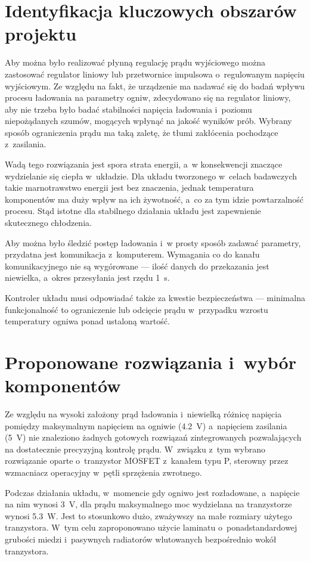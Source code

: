 \documentclass[polish,engineer]{polsl-msth}
\begin{document}
\section{Identyfikacja kluczowych obszarów projektu}
Aby można było realizować płynną regulację prądu wyjściowego można zastosować regulator liniowy lub przetwornice impulsowa o~regulowanym napięciu wyjściowym. Ze względu na fakt, że urządzenie ma nadawać się do badań wpływu procesu ładowania na parametry ogniw, zdecydowano się na regulator liniowy, aby nie trzeba było badać stabilności napięcia ładowania i~poziomu niepożądanych szumów, mogących wpłynąć na jakość wyników prób. Wybrany sposób ograniczenia prądu ma taką zaletę, że tłumi zakłócenia pochodzące z~zasilania.

Wadą tego rozwiązania jest spora strata energii, a~w konsekwencji znaczące wydzielanie się ciepła w~układzie. Dla układu tworzonego w~celach badawczych takie marnotrawstwo energii jest bez znaczenia, jednak temperatura komponentów ma duży wpływ na ich żywotność, a~co za tym idzie powtarzalność procesu. Stąd istotne dla stabilnego działania układu jest zapewnienie skutecznego chłodzenia.

Aby można było śledzić postęp ładowania i~w prosty sposób zadawać parametry, przydatna jest komunikacja z~komputerem. Wymagania co do kanału komunikacyjnego nie są wygórowane --- ilość danych do przekazania jest niewielka, a~okres przesyłania jest rzędu 1~s.

Kontroler układu musi odpowiadać także za kwestie bezpieczeństwa --- minimalna funkcjonalność to ograniczenie lub odcięcie prądu w~przypadku wzrostu temperatury ogniwa ponad ustaloną wartość.

\section{Proponowane rozwiązania i~wybór komponentów}
Ze względu na wysoki założony prąd ładowania i~niewielką różnicę napięcia pomiędzy maksymalnym napięciem na ogniwie (4.2~V) a~napięciem zasilania (5~V) nie znaleziono żadnych gotowych rozwiązań zintegrowanych pozwalających na dostatecznie precyzyjną kontrolę prądu. W~związku z~tym wybrano rozwiązanie oparte o~tranzystor MOSFET z~kanałem typu P, sterowny przez wzmacniacz operacyjny w~pętli sprzężenia zwrotnego.

Podczas działania układu, w~momencie gdy ogniwo jest rozładowane, a~napięcie na nim wynosi 3~V, dla prądu maksymalnego moc wydzielana na tranzystorze wynosi 5.3~W. Jest to stosunkowo dużo, zważywszy na małe rozmiary użytego tranzystora. W~tym celu zaproponowano użycie laminatu o~ponadstandardowej grubości miedzi i~pasywnych radiatorów wlutowanych bezpośrednio wokół tranzystora.
\end{document}
